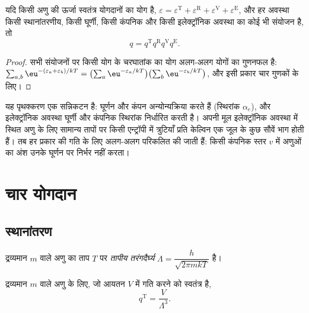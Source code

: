\begin{proposition}[गुणनखंडन]\label{prop:b3:partition-functions:factorisation}
यदि किसी अणु की ऊर्जा स्वतंत्र योगदानों का योग है,
$\varepsilon = \varepsilon^{\mathrm T} + \varepsilon^{\mathrm R} + \varepsilon^{\mathrm V} + \varepsilon^{\mathrm E}$, और हर अवस्था
किसी स्थानांतरणीय, किसी घूर्णी, किसी कंपनिक और किसी
इलेक्ट्रॉनिक अवस्था का कोई भी संयोजन है, तो
\[
  q = q^{\mathrm T}q^{\mathrm R}q^{\mathrm V}q^{\mathrm E}.
\]
\end{proposition}

\begin{proof}
सभी संयोजनों पर किसी योग के चरघातांक का योग अलग-अलग योगों का
गुणनफल है: $\sum_{a,b}\eu^{-(\varepsilon_a+\varepsilon_b)/kT} = \bigl(\sum_a\eu^{-\varepsilon_a/kT}\bigr)
\bigl(\sum_b\eu^{-\varepsilon_b/kT}\bigr)$, और इसी प्रकार चार गुणकों के लिए।
\end{proof}

यह पृथक्करण एक सन्निकटन है: घूर्णन और कंपन अन्योन्यक्रिया करते हैं (स्थिरांक
$\alpha_e$), और इलेक्ट्रॉनिक अवस्था घूर्णी और कंपनिक स्थिरांक निर्धारित करती है।
अपनी मूल इलेक्ट्रॉनिक अवस्था में स्थित अणु के लिए सामान्य तापों पर
किसी एन्ट्रॉपी में त्रुटियाँ प्रति केल्विन एक जूल के कुछ सौवें भाग होती हैं। तब
 हर प्रकार की गति के लिए अलग-अलग परिकलित की जाती हैं:
किसी कंपनिक स्तर $v$ में अणुओं का अंश उनके घूर्णन पर निर्भर नहीं करता।

\section{चार योगदान}

\subsection*{स्थानांतरण}

\begin{definition}[तापीय तरंगदैर्घ्य]\label{def:b3:partition-functions:thermal-wavelength}
द्रव्यमान $m$ वाले अणु का ताप $T$ पर \emph{तापीय तरंगदैर्घ्य}
$\Lambda = \dfrac{h}{\sqrt{2\pi mkT}}$ है।
\end{definition}

\begin{proposition}\label{prop:b3:partition-functions:q-trans}
द्रव्यमान $m$ वाले अणु के लिए, जो आयतन $V$ में गति करने को स्वतंत्र है,
\[
  q^{\mathrm T} = \frac{V}{\Lambda^3}.
\]
\end{proposition}

